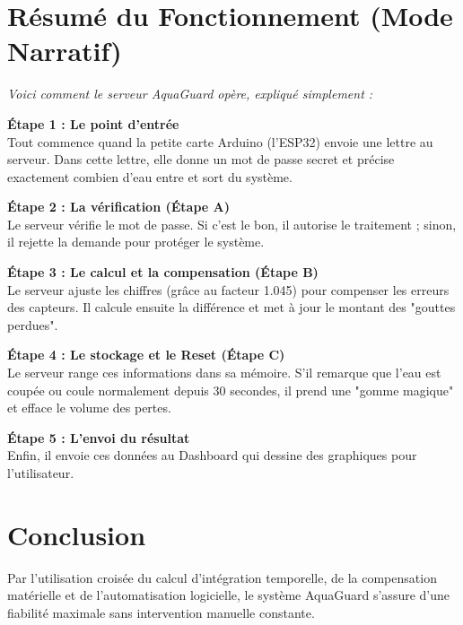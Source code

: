 \documentclass[12pt,a4paper]{article}
\begin{document}
\section{Résumé du Fonctionnement (Mode Narratif)}
\textit{Voici comment le serveur AquaGuard opère, expliqué simplement :}

\textbf{Étape 1 : Le point d'entrée} \\ Tout commence quand la petite carte Arduino (l'ESP32) envoie une lettre au serveur. Dans cette lettre, elle donne un mot de passe secret et précise exactement combien d'eau entre et sort du système.

\textbf{Étape 2 : La vérification (Étape A)} \\ Le serveur vérifie le mot de passe. Si c'est le bon, il autorise le traitement ; sinon, il rejette la demande pour protéger le système.

\textbf{Étape 3 : Le calcul et la compensation (Étape B)} \\ Le serveur ajuste les chiffres (grâce au facteur 1.045) pour compenser les erreurs des capteurs. Il calcule ensuite la différence et met à jour le montant des "gouttes perdues".

\textbf{Étape 4 : Le stockage et le Reset (Étape C)} \\ Le serveur range ces informations dans sa mémoire. S'il remarque que l'eau est coupée ou coule normalement depuis 30 secondes, il prend une "gomme magique" et efface le volume des pertes.

\textbf{Étape 5 : L'envoi du résultat} \\ Enfin, il envoie ces données au Dashboard qui dessine des graphiques pour l'utilisateur.

\section{Conclusion}
Par l'utilisation croisée du calcul d'intégration temporelle, de la compensation matérielle et de l'automatisation logicielle, le système \textcolor{bleuprincipal}{AquaGuard} s'assure d'une fiabilité maximale sans intervention manuelle constante.
\end{document}
